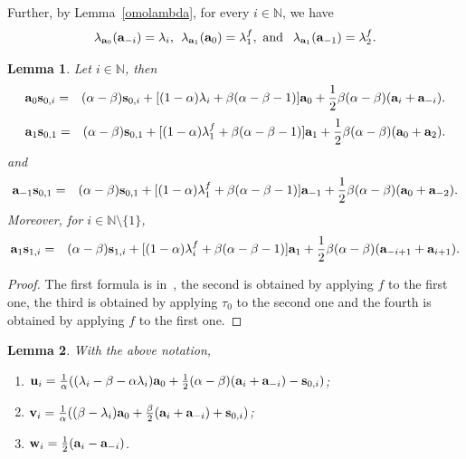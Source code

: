 \documentclass[a4paper]{amsart}
\newtheorem{lemma}{Lemma}[section]
\newcommand{\N}{{\mathbb N}}
\newcommand{\bt}{\beta}
\newcommand{\bv}{{\bf v}}
\newcommand{\ba}{{\bf a}}
\newcommand{\bw}{{\bf w}}
\newcommand{\bu}{{\bf u}}
\newcommand{\bs}{{\bf s}}
\begin{document}
Further, by Lemma~\ref{omolambda}, for every $i\in \N$, we have 
\begin{equation}\label{nonsisa}
\lambda_{\ba_0}(\ba_{-i})=\lambda_i, \:\:
\lambda_{\ba_1}(\ba_0) =\lambda_1^f, \mbox{ and }\:\:
 \lambda_{\ba_1}(\ba_{-1})= \lambda_2^f.
 \end{equation}

 \begin{lemma}\label{primo}
Let $i\in \N$, then  
\begin{eqnarray*}
\ba_0\bs_{0,i}&=&( \alpha- \beta) \bs_{0,i}+[(1- \alpha)\lambda_i +\beta( \alpha- \beta- 1)]\ba_0+\frac{1}{2}\beta( \alpha - \beta)(\ba_i+\ba_{-i}).
\end{eqnarray*}
\begin{eqnarray*}
\ba_1\bs_{0,1}&=&( \alpha- \beta) \bs_{0,1}+[(1- \alpha)\lambda_1^f +\beta( \alpha- \beta- 1)]\ba_1+\frac{1}{2}\beta( \alpha - \beta)(\ba_0+\ba_{2}).
\end{eqnarray*}
and 
\begin{eqnarray*}
\ba_{-1}\bs_{0,1}&=&( \alpha- \beta) \bs_{0,1}+[(1- \alpha)\lambda_1^f +\beta( \alpha- \beta- 1)]\ba_{-1}+\frac{1}{2}\beta( \alpha - \beta)(\ba_0+\ba_{-2}).
\end{eqnarray*}
Moreover, for $i\in \N\setminus \{1\}$, 
\begin{eqnarray*}
\ba_1\bs_{1,i}&=&( \alpha- \beta) \bs_{1,i}+[(1- \alpha)\lambda_i^f +\beta( \alpha- \beta- 1)]\ba_1+\frac{1}{2}\beta( \alpha - \beta)(\ba_{-i+1}+\ba_{i+1}).
\end{eqnarray*}
\end{lemma}
\begin{proof}
The first formula is in~\cite[Lemma~3.1]{R}, the second is obtained by applying $f$  to the first one, the third is obtained by applying $\tau_0$ to the second one and the fourth is obtained by applying $f$ to the first one.
\end{proof}



 
  
 \begin{lemma}
\label{lambdaa}
With the above notation,   
\begin{enumerate}
\item $\bu_i=\frac{1}{\alpha} ((\lambda_i  - \beta - \alpha \lambda_i ) \ba_0 + \frac{1}{2}(\alpha - \beta) (\ba_i + \ba_{-i})-\bs_{0,i} )$;
\item $\bv_i=\frac{1}{\alpha} ((\bt-\lambda_i )\ba_0+\frac{\bt}{2}(\ba_i+\ba_{-i})+\bs_{0,i})$;
\item $\bw_i=\frac{1}{2}(\ba_i-\ba_{-i})$.
\end{enumerate}
\end{lemma}
\end{document}
